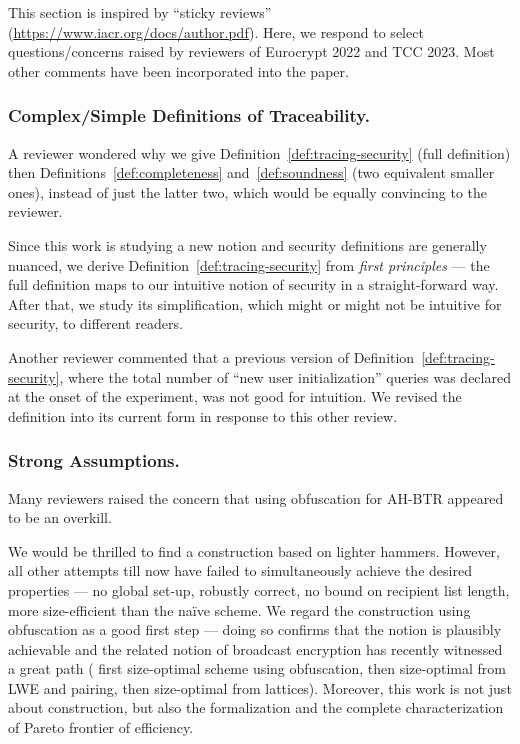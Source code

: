 This section is inspired by ``sticky reviews''
(\url{https://www.iacr.org/docs/author.pdf}).
Here, we respond to select questions/concerns raised by reviewers
of Euro\-crypt 2022 and TCC 2023.
Most other comments have been incorporated into the paper.

\subsubsection{Complex/Simple Definitions of Traceability.}
A reviewer wondered why we give
Definition~\ref{def:tracing-security} (full definition)
then Definitions~\ref{def:completeness} and~\ref{def:soundness}
(two equivalent smaller ones),
instead of just the latter two,
which would be equally convincing to the reviewer.

Since this work is studying a new notion and
security definitions are generally nuanced,
we derive Definition~\ref{def:tracing-security}
from \emph{first principles} ---
the full definition maps to our intuitive notion of security
in a straight-forward way.
After that, we study its simplification,
which might or might not be intuitive for security,
to different readers.

Another reviewer commented that
a previous version of Definition~\ref{def:tracing-security},
where the total number of ``new user initialization'' queries
was declared at the onset of the experiment,
was not good for intuition.
We revised the definition into its current form
in response to this other review.

\subsubsection{Strong Assumptions.}
Many reviewers raised the concern
that using obfuscation for AH-BTR appeared to be an overkill.

We would be thrilled to find a construction based on lighter hammers.
However, all other attempts till now have failed
to simultaneously achieve the desired properties ---
no global set-up,
robustly correct,
no bound on recipient list length,
more size-efficient than the na\"ive scheme.
We regard the construction using obfuscation as a good first step ---
doing so confirms that the notion is plausibly achievable and
the related notion of broadcast encryption has recently witnessed a great path
(\cite{C:BonWatZha14} first size-optimal scheme using obfuscation, then
\cite{EC:AgrYam20,TCC:AgrWicYam20} size-optimal from LWE and pairing, then
\cite{EC:Wee22} size-optimal from lattices).
Moreover, this work is not just about construction,
but also the formalization and
the complete characterization of Pareto frontier of efficiency.
